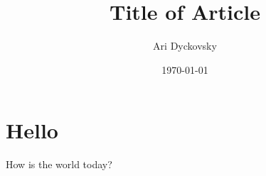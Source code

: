 \documentclass[11pt,a4paper]{article}
\title{Title of Article} %
\author{Ari Dyckovsky} %
\date{\today} %
\begin{document}
\maketitle

\section{Hello}

How is the world today?

\printbibliography[
  title={References} %
]
\end{document}
